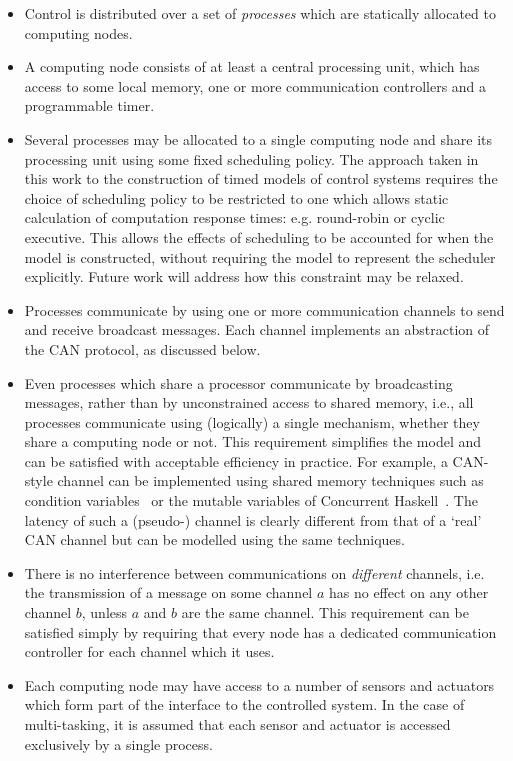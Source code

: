 \begin{itemize}
\item Control is distributed over a set of {\em processes\/} which are
  statically allocated to computing nodes. 
\item A computing node consists
  of at least a central processing unit, which has access to some
  local memory, one or more communication controllers and a
  programmable timer.
\item Several processes may be allocated to a single computing node and 
  share its processing unit using some fixed scheduling policy. The
  approach taken in this work to the construction of timed models of
  control systems requires the choice of scheduling policy to be
  restricted to one which allows static calculation of computation
  response times: e.g. round-robin or cyclic executive. This allows
  the effects of scheduling to be accounted for when the model is
  constructed, without requiring the model to represent the scheduler
  explicitly. Future work will address how this constraint may be
  relaxed.
\item Processes communicate by using one or more communication channels 
  to send and receive broadcast messages. Each channel implements an
  abstraction of the CAN protocol, as discussed below.
\item Even processes which share a processor communicate by
  broadcasting messages, rather than by unconstrained access to shared
  memory, i.e., all processes communicate using (logically) a single
  mechanism, whether they share a computing node or not. This
  requirement simplifies the model and can be satisfied with
  acceptable efficiency in practice. For example, a CAN-style channel
  can be implemented using shared memory techniques such as condition
  variables~\cite{iso:96} or the mutable variables of Concurrent
  Haskell~\cite{pgf:96}. The latency of such a (pseudo-) channel is
  clearly different from that of a `real' CAN channel but can be
  modelled using the same techniques.
\item There is no interference between communications on \emph{different}
  channels, i.e. the transmission of a message on some channel $a$ has
  no effect on any other channel $b$, unless $a$ and $b$ are the same
  channel. This requirement can be satisfied simply by requiring that
  every node has a dedicated communication controller for each channel
  which it uses.
\item Each computing node may have access to a number of sensors
  and actuators which form part of the interface to the controlled
  system. In the case of multi-tasking, it is assumed that each sensor and
  actuator is accessed exclusively by a single process.
\end{itemize} 
  

